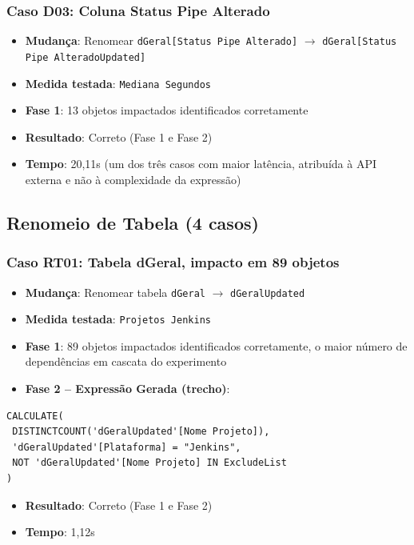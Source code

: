 \subsubsection{Caso D03: Coluna Status Pipe Alterado}

\begin{itemize}
    \item \textbf{Mudança}: Renomear \texttt{dGeral[Status Pipe Alterado]} $\rightarrow$ \texttt{dGeral[Status Pipe AlteradoUpdated]}
    \item \textbf{Medida testada}: \texttt{Mediana Segundos}
    \item \textbf{Fase 1}: 13 objetos impactados identificados corretamente
    \item \textbf{Resultado}: Correto (Fase 1 e Fase 2)
    \item \textbf{Tempo}: 20,11s (um dos três casos com maior latência, atribuída à API externa e não à complexidade da expressão)
\end{itemize}

\subsection{Renomeio de Tabela (4 casos)}

\subsubsection{Caso RT01: Tabela dGeral, impacto em 89 objetos}

\begin{itemize}
    \item \textbf{Mudança}: Renomear tabela \texttt{dGeral} $\rightarrow$ \texttt{dGeralUpdated}
    \item \textbf{Medida testada}: \texttt{Projetos Jenkins}
    \item \textbf{Fase 1}: 89 objetos impactados identificados corretamente, o maior número de dependências em cascata do experimento
    \item \textbf{Fase 2 -- Expressão Gerada (trecho)}:
\end{itemize}

\begin{verbatim}
CALCULATE(
 DISTINCTCOUNT('dGeralUpdated'[Nome Projeto]),
 'dGeralUpdated'[Plataforma] = "Jenkins",
 NOT 'dGeralUpdated'[Nome Projeto] IN ExcludeList
)
\end{verbatim}

\begin{itemize}
    \item \textbf{Resultado}: Correto (Fase 1 e Fase 2)
    \item \textbf{Tempo}: 1,12s
\end{itemize}

